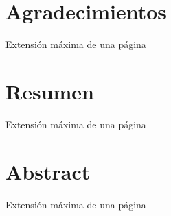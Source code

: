 \chapter{Agradecimientos}

Extensión máxima de una página

\chapter{Resumen}

Extensión máxima de una página

\chapter{Abstract}

Extensión máxima de una página
